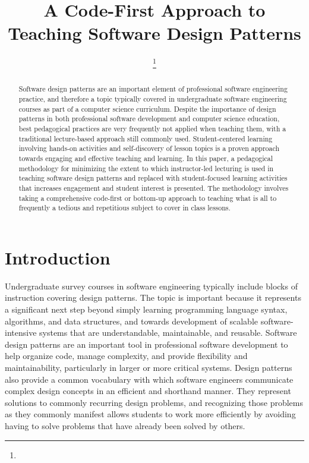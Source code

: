 \documentclass[conference]{IEEEtran}
\begin{document}
\title{A Code-First Approach to Teaching Software Design Patterns}

\author{
\thanks{}}

\maketitle


\begin{abstract}
Software design patterns are an important element of professional software engineering practice, and therefore a topic typically covered in undergraduate software engineering courses as part of a computer science curriculum. Despite the importance of design patterns in both professional software development and computer science education, best pedagogical practices are very frequently not applied when teaching them, with a traditional lecture-based approach still commonly used. Student-centered learning involving hands-on activities and self-discovery of lesson topics is a proven approach towards engaging and effective teaching and learning. In this paper, a pedagogical methodology for minimizing the extent to which instructor-led lecturing is used in teaching software design patterns and replaced with student-focused learning activities that increases engagement and student interest is presented. The methodology involves taking a comprehensive code-first or bottom-up approach to teaching what is all to frequently a tedious and repetitious subject to cover in class lessons.
\end{abstract}

\section{Introduction}
Undergraduate survey courses in software engineering typically include blocks of instruction covering design patterns. The topic is important because it represents a significant next step beyond simply learning programming language syntax, algorithms, and data structures, and towards development of scalable software-intensive systems that are understandable, maintainable, and reusable. Software design patterns are an important tool in professional software development to help organize code, manage complexity, and provide flexibility and maintainability, particularly in larger or more critical systems. Design patterns also provide a common vocabulary with which software engineers communicate complex design concepts in an efficient and shorthand manner. They represent solutions to commonly recurring design problems, and recognizing those problems as they commonly manifest allows students to work more efficiently by avoiding having to solve problems that have already been solved by others.
\end{document}
